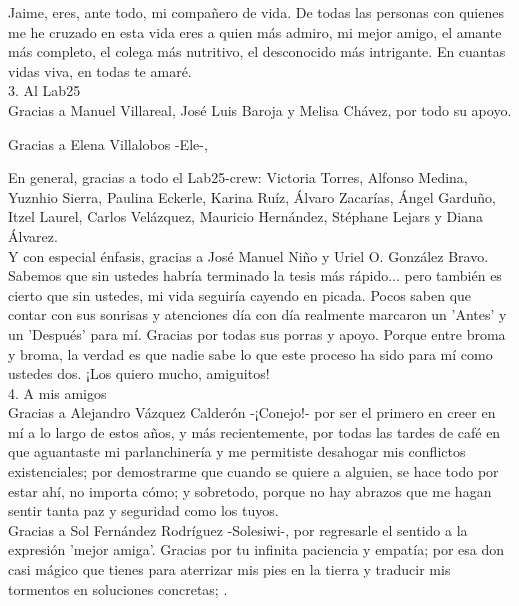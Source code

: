 \documentclass[
12pt, %
spanish, %
singlespacing, %
headsepline, %
]{MastersDoctoralThesis} %
\begin{document}
\begin{acknowledgements}
Jaime, eres, ante todo, mi compañero de vida. De todas las personas con quienes me he cruzado en esta vida eres a quien más admiro, mi mejor amigo, el amante más completo, el colega más nutritivo, el desconocido más intrigante. En cuantas vidas viva, en todas te amaré.\\

3. Al Lab25\\

Gracias a Manuel Villareal, José Luis Baroja y Melisa Chávez, por todo su apoyo.

Gracias a Elena Villalobos -Ele-,  

En general, gracias a todo el Lab25-crew: Victoria Torres, Alfonso Medina, Yuznhio Sierra, Paulina Eckerle, Karina Ruíz, Álvaro Zacarías, Ángel Garduño, Itzel Laurel, Carlos Velázquez, Mauricio Hernández, Stéphane Lejars y Diana Álvarez.\\


Y con especial énfasis, gracias a José Manuel Niño y Uriel O. González Bravo. Sabemos que sin ustedes habría terminado la tesis más rápido... pero también es cierto que sin ustedes, mi vida seguiría cayendo en picada. Pocos saben que contar con sus sonrisas y atenciones día con día realmente marcaron un 'Antes' y un 'Después' para mí. Gracias por todas sus porras y apoyo. Porque entre broma y broma, la verdad es que nadie sabe lo que este proceso ha sido para mí como ustedes dos. ¡Los quiero mucho, amiguitos!\\

4. A mis amigos\\


Gracias a Alejandro Vázquez Calderón -¡Conejo!- por ser el primero en creer en mí a lo largo de estos años, y más recientemente, por todas las tardes de café en que aguantaste mi parlanchinería y me permitiste desahogar mis conflictos existenciales; por demostrarme que cuando se quiere a alguien, se hace todo por estar ahí, no importa cómo; y sobretodo, porque no hay abrazos que me hagan sentir tanta paz y seguridad como los tuyos.\\

Gracias a Sol Fernández Rodríguez -Solesiwi-, por regresarle el sentido a la expresión 'mejor amiga'. Gracias por tu infinita paciencia y empatía; por esa don casi mágico que tienes para aterrizar mis pies en la tierra y traducir mis tormentos en soluciones concretas; .\\


\end{acknowledgements}
\end{document}
